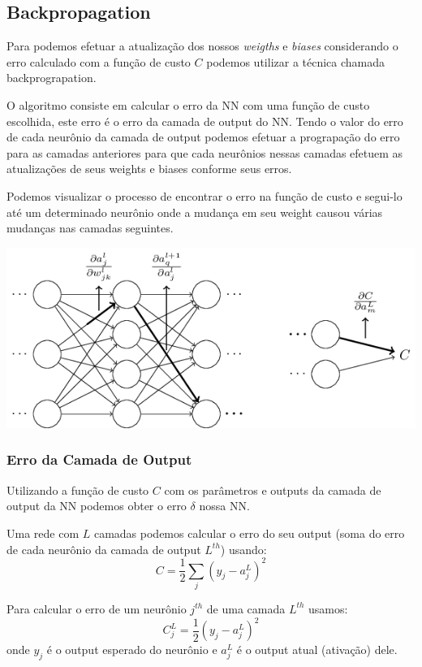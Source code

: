 \documentclass[11pt,a4paper,leqno]{article}
\begin{document}
\subsection{Backpropagation}
Para podemos efetuar a atualização dos nossos \emph{weigths} e \emph{biases} considerando o erro calculado com a função de custo $C$ podemos utilizar a técnica chamada backprograpation.

O algoritmo consiste em calcular o erro da NN com uma função de custo escolhida, este erro é o erro da camada de output do NN. Tendo o valor do erro de cada neurônio da camada de output podemos efetuar a prograpação do erro para as camadas anteriores para que cada neurônios nessas camadas efetuem as atualizações de seus weights e biases conforme seus erros.

Podemos visualizar o processo de encontrar o erro na função de custo e segui-lo até um determinado neurônio onde a mudança em seu weight causou várias mudanças nas camadas seguintes.

\includegraphics[scale=0.5]{Images/backpropagation_delta_w_effect.png} 

\subsubsection{Erro da Camada de Output}
Utilizando a função de custo $C$ com os parâmetros e outputs da camada de output da NN podemos obter o erro $\delta$ nossa NN.

Uma rede com $L$ camadas podemos calcular o erro do seu output (soma do erro de cada neurônio da camada de output $L^{th}$) usando:
\[
C = \frac{1}{2} \sum_j (y_j - a^L_j)^2
\]

Para calcular o erro de um neurônio $j^{th}$ de uma camada $L^{th}$ usamos:
\[
C^L_j = \frac{1}{2} (y_j - a^L_j)^2
\]
onde $y_j$ é o output esperado do neurônio e $a^L_j$ é o output atual (ativação) dele.
\end{document}
